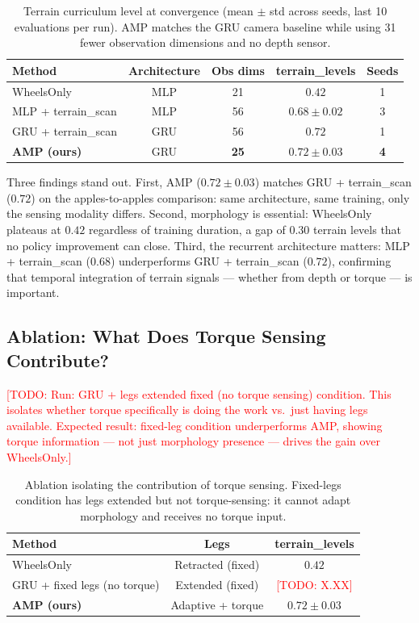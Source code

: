 \documentclass{article}
\newcommand{\todo}[1]{\textcolor{red}{[TODO: #1]}}
\begin{document}
\begin{table}[h]
\centering
\begin{tabular}{lcccc}
\toprule
Method & Architecture & Obs dims & terrain\_levels & Seeds \\
\midrule
WheelsOnly           & MLP  & 21  & $0.42$           & 1 \\
MLP + terrain\_scan  & MLP  & 56  & $0.68 \pm 0.02$  & 3 \\
GRU + terrain\_scan & GRU & 56  & $0.72$           & 1 \\
\textbf{AMP (ours)}  & GRU & \textbf{25}  & $\mathbf{0.72 \pm 0.03}$ & \textbf{4} \\
\bottomrule
\end{tabular}
\caption{Terrain curriculum level at convergence (mean $\pm$ std across seeds, last 10
evaluations per run). AMP matches the GRU camera baseline while using 31 fewer
observation dimensions and no depth sensor.}
\label{tab:sim_results}
\end{table}

Three findings stand out. First, AMP ($0.72 \pm 0.03$) matches GRU + terrain\_scan
($0.72$) on the apples-to-apples comparison: same architecture, same training, only
the sensing modality differs. Second, morphology is essential: WheelsOnly plateaus at
$0.42$ regardless of training duration, a gap of $0.30$ terrain levels that no policy
improvement can close. Third, the recurrent architecture matters: MLP + terrain\_scan
($0.68$) underperforms GRU + terrain\_scan ($0.72$), confirming that temporal
integration of terrain signals --- whether from depth or torque --- is important.

\subsection{Ablation: What Does Torque Sensing Contribute?}
\label{sec:ablation}

\todo{Run: GRU + legs extended fixed (no torque sensing) condition. This isolates
whether torque specifically is doing the work vs.\ just having legs available. Expected
result: fixed-leg condition underperforms AMP, showing torque information --- not just
morphology presence --- drives the gain over WheelsOnly.}

\begin{table}[h]
\centering
\begin{tabular}{lcc}
\toprule
Method & Legs & terrain\_levels \\
\midrule
WheelsOnly                     & Retracted (fixed) & $0.42$ \\
GRU + fixed legs (no torque)   & Extended (fixed)  & \todo{X.XX} \\
\textbf{AMP (ours)}            & Adaptive + torque & $0.72 \pm 0.03$ \\
\bottomrule
\end{tabular}
\caption{Ablation isolating the contribution of torque sensing. Fixed-legs condition
has legs extended but not torque-sensing: it cannot adapt morphology and receives no
torque input.}
\label{tab:ablation}
\end{table}
\end{document}
